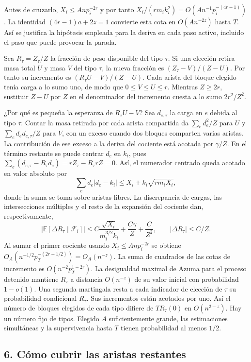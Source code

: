 \documentclass[spanish,11pt,a4paper]{article}
\begin{document}
Antes de cruzarlo, \(X_i\le Anp_i^{-2r}\) y por tanto \(X_i/(rm_i k_i^2)=O(An^{-1}p_i^{-(4r-1)})\). La identidad \((4r-1)a+2z=1\) convierte esta cota en \(O(An^{-2z})\) hasta \(T\). Así se justifica la hipótesis empleada para la deriva en cada paso activo, incluido el paso que puede provocar la parada.

Sea \(R_\tau=Z_\tau/Z\) la fracción de peso disponible del tipo \(\tau\). Si una elección retira masa total \(U\) y masa \(V\) del tipo \(\tau\), la nueva fracción es \((Z_\tau-V)/(Z-U)\). Por tanto su incremento es \((R_\tau U-V)/(Z-U)\). Cada arista del bloque elegido tenía carga a lo sumo uno, de modo que \(0\le V\le U\le r\). Mientras \(Z\ge2r\), sustituir \(Z-U\) por \(Z\) en el denominador del incremento cuesta a lo sumo \(2r^2/Z^2\).

¿Por qué es pequeña la esperanza de \(R_\tau U-V\)? Sea \(d_{e,\tau}\) la carga en \(e\) debida al tipo \(\tau\). Contar la masa retirada por cada arista compartida da \(\sum_e d_e^2/Z\) para \(U\) y \(\sum_e d_e d_{e,\tau}/Z\) para \(V\), con un exceso cuando dos bloques comparten varias aristas. La contribución de ese exceso a la deriva del cociente está acotada por \(\gamma/Z\). En el término restante se puede centrar \(d_e\) en \(k_i\), pues \(\sum_e(d_{e,\tau}-R_\tau d_e)=rZ_\tau-R_\tau rZ=0\). Así, el numerador centrado queda acotado en valor absoluto por \[\sum_e d_e|d_e-k_i|\le X_i+k_i\sqrt{rm_iX_i},\] donde la suma se toma sobre aristas libres. La discrepancia de cargas, las intersecciones múltiples y el resto de la expansión del cociente dan, respectivamente, \[|\mathbb E[\Delta R_\tau\mid\mathcal F_i]|
 \le C\frac{\sqrt{X_i}}{m_i^{3/2}k_i}+\frac{C\gamma}{Z}+\frac C{Z^2},
 \qquad |\Delta R_\tau|\le C/Z .\] Al sumar el primer cociente usando \(X_i\le Anp_i^{-2r}\) se obtiene \(O_A(n^{-1/2}p_T^{-(2r-1/2)})=O_A(n^{-z})\). La suma de cuadrados de las cotas de incremento es \(O(n^{-2}p_T^{1-2r})\). La desigualdad maximal de Azuma para el proceso detenido mantiene \(R_\tau\) a distancia \(O(n^{-z})\) de su valor inicial con probabilidad \(1-o(1)\). Una segunda martingala resta a cada indicador de elección de \(\tau\) su probabilidad condicional \(R_\tau\). Sus incrementos están acotados por uno. Así el número de bloques elegidos de cada tipo difiere de \(T R_\tau(0)\) en \(O(n^{2-z})\). Hay un número fijo de tipos. Elegido \(A\) suficientemente grande, las estimaciones simultáneas y la supervivencia hasta \(T\) tienen probabilidad al menos \(1/2\).

\subsection{6. Cómo cubrir las aristas restantes}\label{cuxf3mo-cubrir-las-aristas-restantes}
\end{document}
